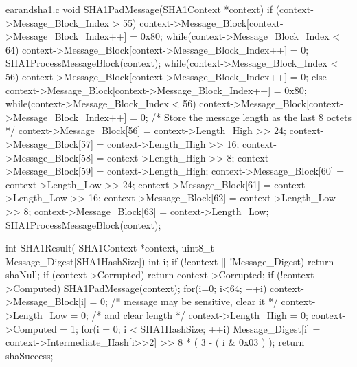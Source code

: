 \begin{chunk}{earandsha1.c}
void SHA1PadMessage(SHA1Context *context) {
  if (context->Message_Block_Index > 55) {
    context->Message_Block[context->Message_Block_Index++] = 0x80;
    while(context->Message_Block_Index < 64) {
      context->Message_Block[context->Message_Block_Index++] = 0;
    }
    SHA1ProcessMessageBlock(context);
    while(context->Message_Block_Index < 56) {
      context->Message_Block[context->Message_Block_Index++] = 0;
    }
  } else {
    context->Message_Block[context->Message_Block_Index++] = 0x80;
    while(context->Message_Block_Index < 56) {
     context->Message_Block[context->Message_Block_Index++] = 0;
    }
  }
  /* Store the message length as the last 8 octets */
  context->Message_Block[56] = context->Length_High >> 24;
  context->Message_Block[57] = context->Length_High >> 16;
  context->Message_Block[58] = context->Length_High >> 8;
  context->Message_Block[59] = context->Length_High;
  context->Message_Block[60] = context->Length_Low >> 24;
  context->Message_Block[61] = context->Length_Low >> 16;
  context->Message_Block[62] = context->Length_Low >> 8;
  context->Message_Block[63] = context->Length_Low;
  SHA1ProcessMessageBlock(context);
}

int SHA1Result( SHA1Context *context, uint8_t Message_Digest[SHA1HashSize]) {
  int i;
  if (!context || !Message_Digest) {
    return shaNull;
  }
  if (context->Corrupted) {
    return context->Corrupted;
  }
  if (!context->Computed) {
    SHA1PadMessage(context);
    for(i=0; i<64; ++i) {
      context->Message_Block[i] = 0; /* message may be sensitive, clear it */
    }
    context->Length_Low = 0;         /* and clear length */
    context->Length_High = 0;
    context->Computed = 1;
  }
  for(i = 0; i < SHA1HashSize; ++i) {
    Message_Digest[i] = 
      context->Intermediate_Hash[i>>2] >> 8 * ( 3 - ( i & 0x03 ) );
  }
  return shaSuccess;
}


\end{chunk}
